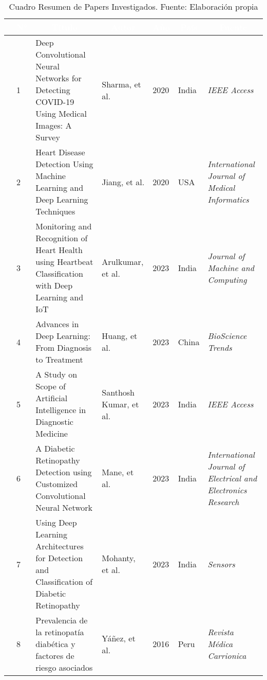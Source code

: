 \begin{table}[h!]
	\centering
	\footnotesize
	\begin{tabular}{|p{0.5cm}|p{0.3cm}|p{4cm}|p{2cm}|p{0.6cm}|p{1.7cm}|p{3cm}|}
		\hline
		\rowcolor{bluejean} \multicolumn{1}{|c|}{\textcolor{white}{Tipo}} & \multicolumn{1}{c|}{\textcolor{white}{N°}} & \multicolumn{1}{c|}{\textcolor{white}{Título}} & \multicolumn{1}{c|}{\textcolor{white}{Autor}} & \multicolumn{1}{c|}{\textcolor{white}{Año}} & \multicolumn{1}{c|}{\textcolor{white}{País}} & \multicolumn{1}{c|}{\textcolor{white}{Fuente}} \\
		\hline
		\multirow{2}{*}{\rotatebox[origin=c]{90}{Problema}} & 1 & Deep Convolutional Neural Networks for Detecting COVID-19 Using Medical Images: A Survey & Sharma, et al. & 2020 & India & \textit{IEEE Access} \\
		\cline{2-7}
		& 2 & Heart Disease Detection Using Machine Learning and Deep Learning Techniques & Jiang, et al. & 2020 & USA & \textit{International Journal of Medical Informatics} \\
		\hline
		\multirow{3}{*}{\rotatebox[origin=c]{90}{Propuesta}} & 3 & Monitoring and Recognition of Heart Health using Heartbeat Classification with Deep Learning and IoT & Arulkumar, et al. & 2023 & India & \textit{Journal of Machine and Computing} \\
		\cline{2-7}
		& 4 & Advances in Deep Learning: From Diagnosis to Treatment & Huang, et al. & 2023 & China & \textit{BioScience Trends} \\
		\cline{2-7}
		& 5 & A Study on Scope of Artificial Intelligence in Diagnostic Medicine & Santhosh Kumar, et al. & 2023 & India & \textit{IEEE Access} \\
		\hline
		\multirow{3}{*}{\rotatebox[origin=c]{90}{Otros}} & 6 & A Diabetic Retinopathy Detection using Customized Convolutional Neural Network & Mane, et al. & 2023 & India & \textit{International Journal of Electrical and Electronics Research} \\
		\cline{2-7}
		& 7 & Using Deep Learning Architectures for Detection and Classification of Diabetic Retinopathy & Mohanty, et al. & 2023 & India & \textit{Sensors} \\
		\cline{2-7}
		& 8 & Prevalencia de la retinopatía diabética y factores de riesgo asociados & Yáñez, et al. & 2016 & Peru & \textit{Revista Médica Carrionica} \\
		\hline
	\end{tabular}
	\caption{Cuadro Resumen de Papers Investigados. Fuente: Elaboración propia}
	\label{A:table}
\end{table}


